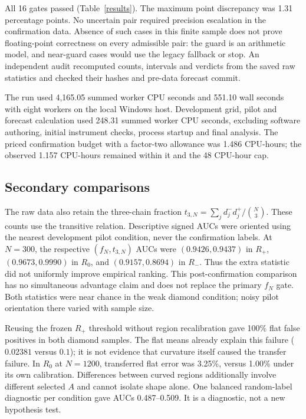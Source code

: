 \documentclass[11pt,a4paper]{article}
\begin{document}
All 16 gates passed (Table~\ref{results}). The maximum point discrepancy
was 1.31 percentage points. No uncertain pair required precision escalation
in the confirmation data. Absence of such cases in this finite sample does
not prove floating-point correctness on every admissible pair: the guard is
an arithmetic model, and near-guard cases would use the legacy fallback or stop.
An independent audit recomputed counts, intervals and verdicts from the saved
raw statistics and checked their hashes and pre-data forecast commit.

The run used 4,165.05 summed worker CPU seconds and 551.10 wall seconds with
eight workers on the local Windows host. Development grid, pilot and forecast
calculation used 248.31 summed worker CPU seconds, excluding software authoring,
initial instrument checks, process startup and final analysis. The priced
confirmation budget with a factor-two allowance was 1.486 CPU-hours; the
observed 1.157 CPU-hours remained within it and the 48 CPU-hour cap.

\subsection{Secondary comparisons}
The raw data also retain the three-chain fraction
$t_{3,N}=\sum_j d^-_j d^+_j/\binom N3$. These counts use the transitive
relation. Descriptive signed AUCs were oriented using the nearest development
pilot condition, never the confirmation labels. At $N=300$, the respective
$(f_N,t_{3,N})$ AUCs were $(0.9426,0.9437)$ in $R_+$,
$(0.9673,0.9990)$ in $R_0$, and $(0.9157,0.8694)$ in $R_-$.
Thus the extra statistic did not uniformly improve empirical ranking. This
post-confirmation comparison has no simultaneous advantage claim and does
not replace the primary $f_N$ gate. Both statistics were near chance in the
weak diamond condition; noisy pilot orientation there varied with sample size.

Reusing the frozen $R_+$ threshold without region recalibration gave 100\%
flat false positives in both diamond samples. The flat means already explain
this failure ($0.02381$ versus $0.1$); it is not evidence that curvature itself
caused the transfer failure. In $R_0$ at $N=1200$, transferred flat error was
3.25\%, versus 1.00\% under its own calibration. Differences between curved
regions additionally involve different selected $A$ and cannot isolate shape alone.
One balanced random-label diagnostic per condition gave AUCs 0.487--0.509.
It is a diagnostic, not a new hypothesis test.
\end{document}
